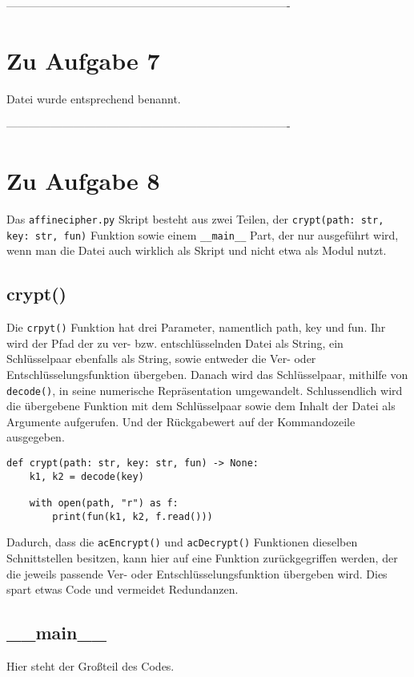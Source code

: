\documentclass[12pt]{article}
\begin{document}
%
 ----------------------------------------------------------------------------
\section{Zu Aufgabe 7}
Datei wurde entsprechend benannt.

%
 ----------------------------------------------------------------------------
\section{Zu Aufgabe 8}
\label{sec:aufgabe_8}
Das \texttt{affinecipher.py} Skript besteht aus zwei Teilen, der \texttt{crypt(path: str, key: str, fun)} Funktion sowie einem \texttt{\_\_main\_\_} Part, der nur ausgeführt wird, wenn man die Datei auch wirklich als Skript und nicht etwa als Modul nutzt.

\subsection{crypt()}
Die \texttt{crpyt()} Funktion hat drei Parameter, namentlich path, key und fun. Ihr wird der Pfad der zu ver- bzw. entschlüsselnden Datei als String, ein Schlüsselpaar ebenfalls als String, sowie entweder die Ver- oder Entschlüsselungsfunktion übergeben. Danach wird das Schlüsselpaar, mithilfe von \texttt{decode()}, in seine numerische Repräsentation umgewandelt. Schlussendlich wird die übergebene Funktion mit dem Schlüsselpaar sowie dem Inhalt der Datei als Argumente aufgerufen. Und der Rückgabewert auf der Kommandozeile ausgegeben.
\begin{lstlisting}
def crypt(path: str, key: str, fun) -> None:
    k1, k2 = decode(key)

    with open(path, "r") as f:
        print(fun(k1, k2, f.read()))

\end{lstlisting}
Dadurch, dass die \texttt{acEncrypt()} und \texttt{acDecrypt()} Funktionen dieselben Schnittstellen besitzen, kann hier auf eine Funktion zurückgegriffen werden, der die jeweils passende Ver- oder Entschlüsselungsfunktion übergeben wird. Dies spart etwas Code und vermeidet Redundanzen.

\subsection{\_\_main\_\_}
Hier steht der Großteil des Codes. 
\end{document}
